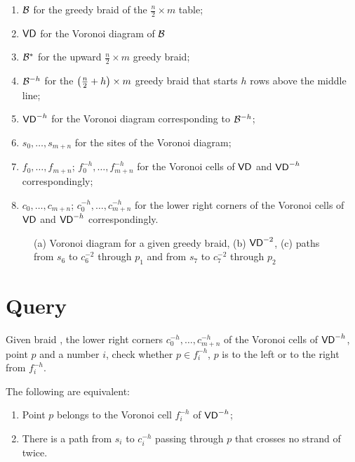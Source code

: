 \documentclass[a4paper,11pt]{article}
\begin{document}
\begin{enumerate}
	\item \(\braid\) for the greedy braid of the \(\frac{n}{2} \times m\) table;
	\item \(\VD\) for the Voronoi diagram of \(\braid\) %
	\item \(\braid^*\) for the upward \(\frac{n}{2} \times m\) greedy braid;
	\item \(\braid^{-h}\) for the \(\lr*{\frac{n}{2} + h} \times m\) greedy braid that starts \(h\) rows above the middle line;
	\item \(\VD^{-h}\) for the Voronoi diagram corresponding to \(\braid^{-h}\);
	\item \(s_0, \ldots, s_{m+n}\) for the sites of the Voronoi diagram;
	\item \(f_0, \ldots, f_{m+n}\); \(f_0^{-h}, \ldots, f_{m+n}^{-h}\) for the Voronoi cells of \(\VD\) and \(\VD^{-h}\) correspondingly;
	\item \(c_0, \ldots, c_{m+n}\); \(c_0^{-h}, \ldots, c_{m+n}^{-h}\) for the lower right corners of the Voronoi cells of \(\VD\) and \(\VD^{-h}\) correspondingly.
\end{enumerate}


\begin{figure}[ht] \centering
	

	

	\caption{(a) Voronoi diagram for a given greedy braid, (b) \(\VD^{-2}\), (c) paths from \(s_6\) to \(c_6^{-2}\) through \(p_1\) and from \(s_7\) to \(c_7^{-2}\) through \(p_2\)}
	\label{fig:vd-ex}
\end{figure}


\section{Query}

\begin{problem}
	Given braid \braid, the lower right corners \(c_0^{-h}, \ldots, c_{m+n}^{-h}\) of the Voronoi cells of \(\VD^{-h}\), point \(p\) and a number \(i\), check whether \(p \in f_i^{-h}\), \(p\) is to the left or to the right from \(f_i^{-h}\).
\end{problem}

\begin{lemma}
	The following are equivalent:
   \begin{enumerate}
	\item Point \(p\) belongs to the Voronoi cell \(f_i^{-h}\) of \(\VD^{-h}\);
	\item There is a path from \(s_i\) to \(c_i^{-h}\) passing through \(p\) that crosses no strand of \braid twice.
   \end{enumerate}
\end{lemma}
\end{document}
